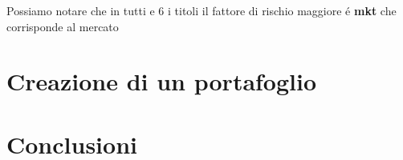 \documentclass{report}
\begin{document}
Possiamo notare che in tutti e 6 i titoli il fattore di rischio maggiore é \textbf{mkt} che corrisponde al mercato

\chapter{Creazione di un portafoglio}
\chapter{Conclusioni}
\tableofcontents
\end{document}
